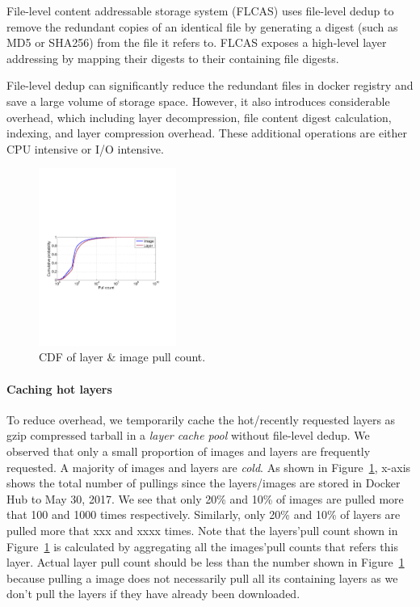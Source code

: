 File-level content addressable storage system (FLCAS) uses file-level dedup to remove the redundant copies of an identical file by generating a digest (such as MD5 or SHA256) from the file it refers to. FLCAS exposes a high-level layer addressing by mapping their digests to their containing file digests.     

File-level dedup can significantly reduce the redundant files in docker registry and save a large volume of storage space. However, it also introduces considerable overhead, which including layer decompression, file content digest calculation, indexing, and layer compression overhead. These additional operations are either CPU intensive or I/O intensive.  

\begin{figure}
	\centering
	\includegraphics[width=0.4\textwidth]{graphs/pull-cnt.pdf}
	\caption{CDF of layer \& image pull count.
	}
	\label{fig:pull-cnt}
\end{figure}

\paragraph{Caching hot layers}To reduce overhead, we temporarily cache the hot/recently requested layers as gzip compressed tarball in a \textit{layer cache pool} without file-level dedup.
We observed that only a small proportion of images and layers are frequently requested. A majority of images and layers are \textit{cold}.
As shown in Figure~\ref{fig:pull-cnt}, x-axis shows the total number of pullings since the layers/images are stored in Docker Hub to May 30, 2017. 
We see that only 20\% and 10\% of images are pulled more that 100 and 1000 times respectively. 
Similarly, only 20\% and 10\% of layers are pulled more that xxx and xxxx times. 
Note that 
the layers'pull count shown in Figure~\ref{fig:pull-cnt} is calculated by aggregating all the images'pull counts that refers this layer. 
Actual layer pull count should be less than the number shown in Figure~\ref{fig:pull-cnt} because pulling a image does not necessarily pull all its containing layers as we don't pull the layers if they have already been downloaded.
 
